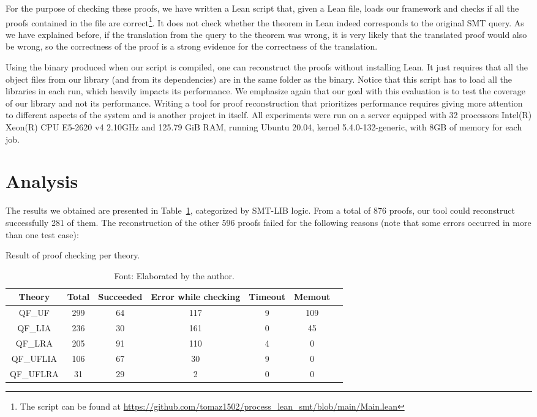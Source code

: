For the purpose of checking these proofs, we have written a Lean script that, given
a Lean file, loads our framework and checks if all the proofs contained in the file
are correct\footnote{The script can
  be found at \url{https://github.com/tomaz1502/process_lean_smt/blob/main/Main.lean}}.
%
It does not check whether the theorem in Lean indeed corresponds to the original SMT query.
%
As we have explained before, if the translation from the query to the theorem was wrong,
it is very likely that the translated proof would also be wrong, so the correctness
of the proof is a strong evidence for the correctness of the translation.

Using the binary produced when our script is compiled, one can reconstruct the
proofs without installing Lean.
%
It just requires that all the object files from our library (and from its dependencies)
are in the same folder as the binary.
%
Notice that this script has to load all the libraries in each run, which heavily impacts
its performance.
%
We emphasize again that our goal with this evaluation is to test the coverage of our
library and not its performance.
%
Writing a tool for proof reconstruction that prioritizes performance requires
giving more attention to different aspects of the system and is another
project in itself.
%
All experiments were run on a server equipped with 32 processors Intel(R) Xeon(R)
CPU E5-2620 v4 2.10GHz and 125.79 GiB RAM, running Ubuntu 20.04,
kernel 5.4.0-132-generic, with 8GB of memory for each job.

\section{Analysis}

The results we obtained are presented in Table~\ref{results_rcons}, categorized
by SMT-LIB logic. From a total of 876 proofs, our tool could reconstruct
successfully 281 of them. The reconstruction of the other 596 proofs
failed for the following reasons (note that some errors occurred in more than one test case):

\begin{table}[t]
\centering
\caption{Result of proof checking per theory.}\label{results_rcons}
\begin{tabular}{ c c c c c c c }
\toprule
Theory  & Total   & Succeeded & Error while checking & Timeout & Memout \\ \midrule
QF\_UF    & 299   & 64    & 117     & 9       & 109  \\ \midrule
QF\_LIA   & 236   & 30    & 161     & 0       & 45   \\ \midrule
QF\_LRA   & 205   & 91    & 110     & 4       & 0    \\ \midrule
QF\_UFLIA & 106   & 67    & 30      & 9       & 0    \\ \midrule
QF\_UFLRA & 31    & 29    & 2       & 0       & 0    \\ \bottomrule
\end{tabular}
\caption*{Font: Elaborated by the author.}
\end{table}

